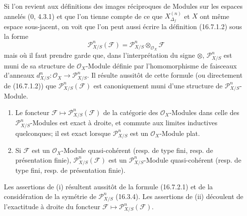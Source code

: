 \begin{env}[16.7.2]
\label{IV.16.7.2}
Si l'on revient aux définitions des images réciproques de Modules sur les
espaces annelés (0, 4.3.1) et que l'on tienne compte de ce que
$X_{\Delta_f}^{(n)}$ et $X$ ont même espace sous-jacent, on voit que l'on peut
aussi écrire la définition (16.7.1.2) sous la forme
\[
  \mathscr{P}_{X/S}^n(\mathscr{F})
  =\mathscr{P}_{X/S}^n\otimes_{\mathcal{O}_X}\mathscr{F}
  \tag{16.7.2.1}
  \label{IV.16.7.2.1}
\]
mais où il faut prendre garde que, dans l'interprétation du signe $\otimes$,
$\mathscr{P}_{X/S}^n$ est muni de sa structure de $\mathcal{O}_X$-Module
définie par l'homomorphisme de faisceaux d'anneaux
$d_{X/S}^n:\mathcal{O}_X\to\mathscr{P}_{X/S}^n$. Il résulte aussitôt de cette
formule (ou directement de (16.7.1.2)) que
$\mathscr{P}_{X/S}^n(\mathscr{F})$ est canoniquement muni d'une structure de
$\mathscr{P}_{X/S}^n$-Module.
\end{env}

\begin{proposition}[16.7.3]
\label{IV.16.7.3}
\begin{enumerate}
\item[(i)] Le foncteur
$\mathscr{F}\mapsto\mathscr{P}_{X/S}^n(\mathscr{F})$ de la catégorie des
$\mathcal{O}_X$-Modules dans celle des $\mathscr{P}_{X/S}^n$-Modules est
exact à droite, et commute aux limites inductives quelconques; il est exact
lorsque $\mathscr{P}_{X/S}^n$ est un $\mathcal{O}_X$-Module plat.
\item[(ii)] Si $\mathscr{F}$ est un $\mathcal{O}_X$-Module quasi-cohérent
(resp. de type fini, resp. de présentation finie),
$\mathscr{P}_{X/S}^n(\mathscr{F})$ est un $\mathscr{P}_{X/S}^n$-Module
quasi-cohérent (resp. de type fini, resp. de présentation finie).
\end{enumerate}
\end{proposition}

Les assertions de (i) résultent aussitôt de la formule (16.7.2.1) et de la
considération de la symétrie de $\mathscr{P}_{X/S}^n$ (16.3.4). Les assertions
de (ii) découlent de l'exactitude à droite du foncteur
$\mathscr{F}\mapsto\mathscr{P}_{X/S}^n(\mathscr{F})$.

